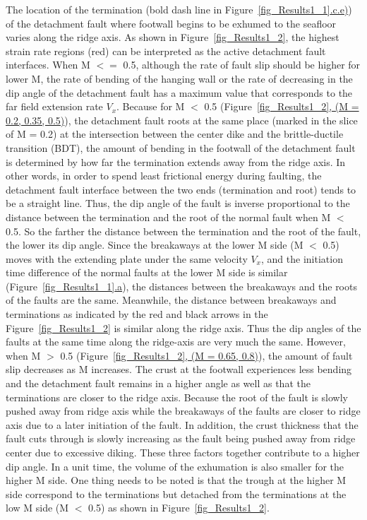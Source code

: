 The location of the termination (bold dash line in Figure~\hyperref[fig_Results1_1]{\ref{fig_Results1_1}.c.e)}) of the detachment fault where footwall begins to be exhumed to the seafloor varies along the ridge axis. As shown in Figure~\hyperref[fig_Results1_2]{\ref{fig_Results1_2}}, the highest strain rate regions (red) can be interpreted as the active detachment fault interfaces. When M $<=$ 0.5, although the rate of fault slip should be higher for lower M, the rate of bending of the hanging wall or the rate of decreasing in the dip angle of the detachment fault has a maximum value that corresponds to the far field extension rate $V_{x}$. Because for M $<$ 0.5 (Figure~\hyperref[fig_Results1_2]{\ref{fig_Results1_2}, (M = 0.2, 0.35, 0.5)}), the detachment fault roots at the same place (marked in the slice of M = 0.2) at the intersection between the center dike and the brittle-ductile transition (BDT), the amount of bending in the footwall of the detachment fault is determined by how far the termination extends away from the ridge axis. In other words, in order to spend least frictional energy during faulting, the detachment fault interface between the two ends (termination and root) tends to be a straight line. Thus, the dip angle of the fault is inverse proportional to the distance between the termination and the root of the normal fault when M $<$ 0.5. So the farther the distance between the termination and the root of the fault, the lower its dip angle. Since the breakaways at the lower M side (M $<$ 0.5) moves with the extending plate under the same velocity $V_{x}$, and the initiation time difference of the normal faults at the lower M side is similar (Figure~\hyperref[fig_Results1_1]{\ref{fig_Results1_1}.a}), the distances between the breakaways and the roots of the faults are the same. Meanwhile, the distance between breakaways and terminations as indicated by the red and black arrows in the Figure~\hyperref[fig_Results1_2]{\ref{fig_Results1_2}} is similar along the ridge axis. Thus the dip angles of the faults at the same time along the ridge-axis are very much the same. However, when M $>$ 0.5 (Figure~\hyperref[fig_Results1_2]{\ref{fig_Results1_2}, (M = 0.65, 0.8)}), the amount of fault slip decreases as M increases. The crust at the footwall experiences less bending and the detachment fault remains in a higher angle as well as that the terminations are closer to the ridge axis. Because the root of the fault is slowly pushed away from ridge axis while the breakaways of the faults are closer to ridge axis due to a later initiation of the fault. In addition, the crust thickness that the fault cuts through is slowly increasing as the fault being pushed away from ridge center due to excessive diking. These three factors together contribute to a higher dip angle. In a unit time, the volume of the exhumation is also smaller for the higher M side. One thing needs to be noted is that the trough at the higher M side correspond to the terminations but detached from the terminations at the low M side (M $<$ 0.5) as shown in Figure~\hyperref[fig_Results1_2]{\ref{fig_Results1_2}}.        



